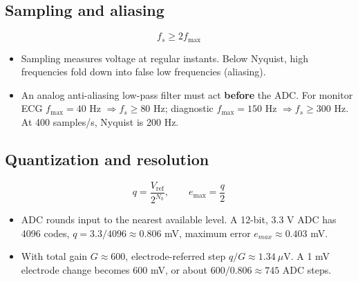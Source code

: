 \documentclass[10pt,a4paper]{ctexart}
\newcommand{\key}[1]{\textbf{#1}}
\newcommand{\formula}[1]{%
  \par\vspace{1pt}%
  \begingroup
  \setlength{\abovedisplayskip}{0pt}%
  \setlength{\belowdisplayskip}{0pt}%
  \[
    #1
  \]
  \endgroup
  \vspace{1pt}%
}
\begin{document}
\begin{multicols*}{3}
\subsection{Sampling and aliasing}
\formula{\displaystyle f_s\ge2f_\mathrm{max}}
\begin{itemize}
  \item Sampling measures voltage at regular instants. Below Nyquist, high
  frequencies fold down into false low frequencies (aliasing).
  \item An analog anti-aliasing low-pass filter must act \key{before} the ADC.
  For monitor ECG $f_\mathrm{max}=40$ Hz $\Rightarrow f_s\ge80$ Hz;
  diagnostic $f_\mathrm{max}=150$ Hz $\Rightarrow f_s\ge300$ Hz.
  At 400 samples/s, Nyquist is 200 Hz.
\end{itemize}

\subsection{Quantization and resolution}
\formula{\displaystyle
  q=\frac{V_\mathrm{ref}}{2^{N_b}},\qquad
  e_\mathrm{max}=\frac q2}
\begin{itemize}
  \item ADC rounds input to the nearest available level. A 12-bit, 3.3 V ADC
  has 4096 codes, $q=3.3/4096\approx0.806$ mV, maximum error
  $e_{max}\approx0.403$ mV.
  \item With total gain $G\approx600$, electrode-referred step
  $q/G\approx1.34~\mu$V. A 1 mV electrode change becomes 600 mV,
  or about $600/0.806\approx745$ ADC steps.
\end{itemize}


\end{multicols*}
\end{document}

